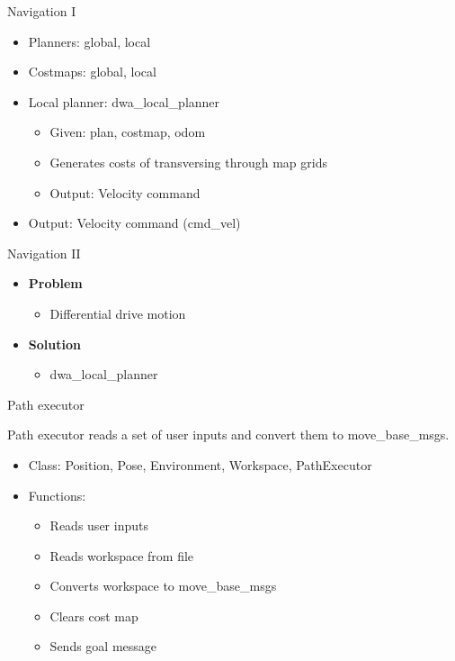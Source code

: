 \begin{frame}{Navigation I}
\begin{itemize}
	\item Planners: global, local
	\item Costmaps: global, local
	\item Local planner: dwa\_local\_planner
		\begin{itemize}
			\item Given: plan, costmap, odom
			\item Generates costs of transversing through map grids
			\item Output: Velocity command
		\end{itemize} 
	\item Output: Velocity command (cmd\_vel)
\end{itemize}
\end{frame}
\begin{frame}{Navigation II}
\begin{itemize}
	\item \textbf{Problem}
		\begin{itemize}
			\item Differential drive motion
		\end{itemize}
	\item \textbf{Solution}
		\begin{itemize}
			\item dwa\_local\_planner
		\end{itemize}
\end{itemize}

\end{frame}
\begin{frame}{Path executor}
    
    Path executor reads  a set of user inputs and convert them to move\_base\_msgs.
    \begin{itemize}
        \item Class: Position, Pose, Environment, Workspace, PathExecutor
        
        \item Functions:
        \begin{itemize}
        	\item Reads user inputs
        	\item Reads workspace from file
            \item Converts workspace to move\_base\_msgs
            \item Clears cost map
            \item Sends goal message
        \end{itemize}
    \end{itemize}
    
\end{frame}

